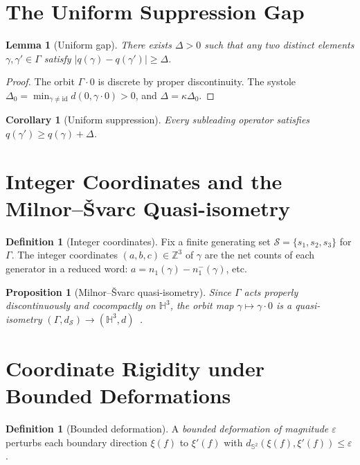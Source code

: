 ﻿\documentclass[12pt]{article}
\newtheorem{lemma}[theorem]{Lemma}
\newtheorem{proposition}[theorem]{Proposition}
\newtheorem{corollary}[theorem]{Corollary}
\theoremstyle{definition}
\newtheorem{definition}[theorem]{Definition}
\theoremstyle{remark}
\newcommand{\Hthree}{\mathbb{H}^3}
\newcommand{\GammaG}{\Gamma}
\newcommand{\Z}{\mathbb{Z}}
\begin{document}
\section{The Uniform Suppression Gap}

\begin{lemma}[Uniform gap]\label{lem:gap}
There exists $\Delta>0$ such that any two distinct elements
$\gamma,\gamma'\in\GammaG$ satisfy $|q(\gamma)-q(\gamma')|\geq\Delta$.
\end{lemma}

\begin{proof}
The orbit $\GammaG\cdot0$ is discrete by proper discontinuity. The systole
$\Delta_0=\min_{\gamma\neq\mathrm{id}}d(0,\gamma\cdot0)>0$, and
$\Delta=\kappa\Delta_0$.
\end{proof}

\begin{corollary}[Uniform suppression]
Every subleading operator satisfies $q(\gamma')\geq q(\gamma)+\Delta$.
\end{corollary}

\section{Integer Coordinates and the Milnor--\v{S}varc Quasi-isometry}

\begin{definition}[Integer coordinates]\label{def:intcoords}
Fix a finite generating set $\mathcal{S}=\{s_1,s_2,s_3\}$ for $\GammaG$.
The integer coordinates $(a,b,c)\in\Z^3$ of $\gamma$ are the net counts
of each generator in a reduced word: $a=n_1(\gamma)-n_1^-(\gamma)$, etc.
\end{definition}

\begin{proposition}[Milnor--\v{S}varc quasi-isometry]
\label{prop:msvarcqi}
Since $\GammaG$ acts properly discontinuously and cocompactly on $\Hthree$,
the orbit map $\gamma\mapsto\gamma\cdot0$ is a quasi-isometry
$(\GammaG,d_\mathcal{S})\to(\Hthree,d)$~\cite{bridsonhaefliger}.
\end{proposition}

\section{Coordinate Rigidity under Bounded Deformations}

\begin{definition}[Bounded deformation]\label{def:deform}
A \emph{bounded deformation of magnitude $\varepsilon$} perturbs each
boundary direction $\xi(f)$ to $\xi'(f)$ with
$d_{\mathbb{S}^2}(\xi(f),\xi'(f))\leq\varepsilon$.
\end{definition}
\end{document}
